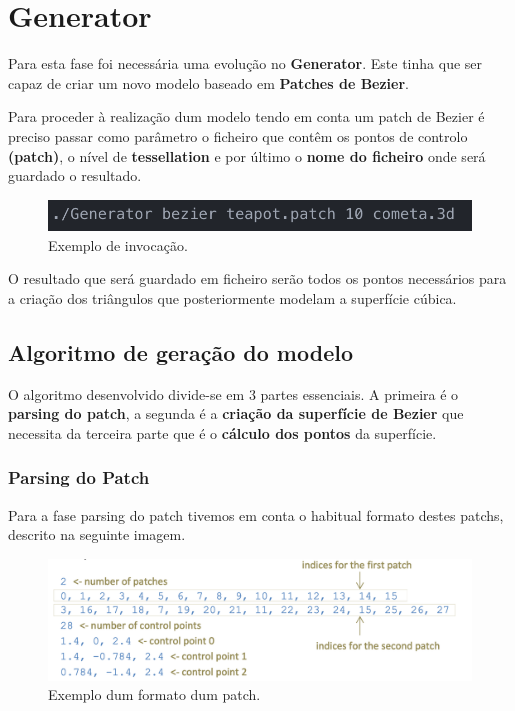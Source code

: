 \documentclass[a4paper]{article}
\begin{document}
\newpage

\section{Generator}
\label{sec:generator}

Para esta fase foi necessária uma evolução no \textbf{Generator}. Este tinha que ser capaz de criar um novo modelo baseado em \textbf{Patches de Bezier}.

Para proceder à realização dum modelo tendo em conta um patch de Bezier é preciso passar como parâmetro o ficheiro que contêm os pontos de controlo  \textbf{(patch)}, o nível de \textbf{tessellation} e por último o \textbf{nome do ficheiro} onde será guardado o resultado.

\begin{figure}[H]
\centering
\includegraphics[scale=0.75]{bezier_command.png}
\caption{Exemplo de invocação.}
\label{img:bezier_command}
\end{figure}

O resultado que será guardado em ficheiro serão todos os pontos necessários para a criação dos triângulos que posteriormente modelam a superfície cúbica.

\subsection{Algoritmo de geração do modelo}
\label{sec:bezier}

O algoritmo desenvolvido divide-se em 3 partes essenciais. A primeira é o \textbf{parsing do patch}, a segunda é a \textbf{criação da superfície de Bezier} que necessita da terceira parte que é o \textbf{cálculo dos pontos} da superfície.

\subsubsection{Parsing do Patch}

Para a fase parsing do patch tivemos em conta o habitual formato destes patchs, descrito na seguinte imagem.

\begin{figure}[H]
\centering
\includegraphics[scale=0.60]{patch_format.png}
\caption{Exemplo dum formato dum patch.}
\label{img:bezier_command}
\end{figure}
\end{document}
